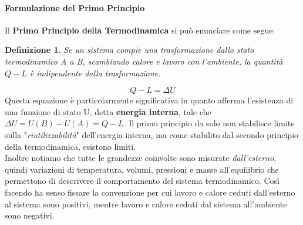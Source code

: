 \documentclass{article}
\newtheorem{defn}{Definizione}[section]
\begin{document}
\paragraph{Formulazione del Primo Principio}
Il \textbf{Primo Principio della Termodinamica} si può enunciare come segue:
\begin{defn}
Se un sistema compie una trasformazione dallo stato termodinamico A a B, scambiando calore e lavoro con l'ambiente, la quantità $Q-L$ è indipendente dalla trasformazione. 
\end{defn}
\begin{equation}
    \boxed{Q-L=\Delta U}
\end{equation}
Questa equazione è particolarmente significativa in quanto afferma l'esistenza di una funzione di stato U, detta \textbf{energia interna}, tale che $\Delta U=U(B)-U(A)=Q-L$. Il primo principio da solo non stabilisce limite sulla "\textit{riutilizzabilità}" dell'energia interna, ma come stabilito dal secondo principio della termodinamica, esistono limiti. \\
Inoltre notiamo che tutte le grandezze coinvolte sono misurate \textit{dall'esterno}, quindi variazioni di temperatura, volumi, pressioni e masse all'equilibrio che permettono di descrivere il comportamento del sistema termodinamico. Così facendo ha senso fissare la convenzione per cui lavoro e calore ceduti dall'esterno al sistema sono positivi, mentre lavoro e calore ceduti dal sistema all'ambiente sono negativi. 
\end{document}
